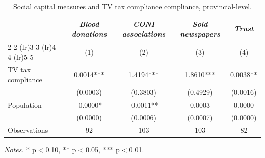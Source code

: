 \begin{table}[!h]\centering\begin{threeparttable}
\caption{Social capital measures and TV tax compliance compliance, provincial-level.\label{tab:mainres-prov}}
\begin{tabular}{lcccc} \hline\hline
&\multicolumn{1}{c}{\textit{Blood donations}}&\multicolumn{1}{c}{\textit{CONI associations}}&\multicolumn{1}{c}{\textit{Sold newspapers}}&\multicolumn{1}{c}{\textit{Trust}}\\ \cmidrule(lr){2-2} \cmidrule(lr){3-3} \cmidrule(lr){4-4} \cmidrule(lr){5-5} 
                    &\multicolumn{1}{c}{(1)}   &\multicolumn{1}{c}{(2)}   &\multicolumn{1}{c}{(3)}   &\multicolumn{1}{c}{(4)}   \\
\hline
TV tax compliance   &      0.0014***&      1.4194***&      1.8610***&      0.0038** \\
                    &    (0.0003)   &    (0.3803)   &    (0.4929)   &    (0.0016)   \\
[1em]
Population          &     -0.0000*  &     -0.0011** &      0.0003   &      0.0000   \\
                    &    (0.0000)   &    (0.0006)   &    (0.0007)   &    (0.0000)   \\
%
Observations        &          92   &         103   &         103   &          82   \\
\hline\hline 
\end{tabular} \begin{tablenotes} \item \scriptsize{\textit{\underline{Notes}.} * p$<$0.10, ** p$<$0.05, *** p$<$0.01. } \end{tablenotes} \end{threeparttable} \end{table}
